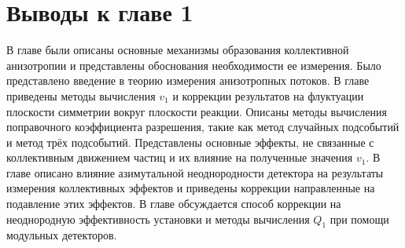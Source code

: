 \section{Выводы к главе 1}

В главе были описаны основные механизмы образования коллективной анизотропии и представлены обоснования необходимости ее измерения.
Было представлено введение в теорию измерения анизотропных потоков. 
В главе приведены методы вычисления $v_1$ и коррекции результатов на флуктуации плоскости симметрии вокруг плоскости реакции.
Описаны методы вычисления поправочного коэффициента разрешения, такие как метод случайных подсобытий и метод трёх подсобытий.
Представлены основные эффекты, не связанные с коллективным движением частиц и их влияние на полученные значения $v_1$.
В главе описано влияние азимутальной неоднородности детектора на результаты измерения коллективных эффектов и приведены коррекции направленные на подавление этих эффектов.
В главе обсуждается способ коррекции на неоднородную эффективность установки и методы вычисления $Q_1$ при помощи модульных детекторов.    